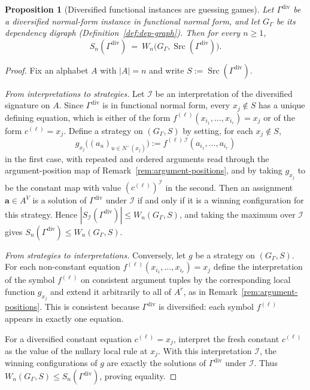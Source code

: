 \documentclass[11pt]{article}
\theoremstyle{plain}
\newtheorem{proposition}[theorem]{Proposition}
\theoremstyle{definition}
\theoremstyle{definition}
\theoremstyle{remark}
\newcommand{\A}{A}
\newcommand{\Sn}{S_n}
\newcommand{\abs}[1]{\left\lvert #1 \right\rvert}
\newcommand{\Src}{\operatorname{Src}}
\begin{document}
\begin{proposition}[Diversified functional instances are guessing games]
\label{prop:div-is-guessing}
Let $\Gamma^{\mathrm{div}}$ be a diversified normal-form instance in functional normal form, and let
$G_{\Gamma}$ be its dependency digraph (Definition~\ref{def:dep-graph}).
Then for every $n\ge 1$,
\[
  \Sn(\Gamma^{\mathrm{div}})\ =\ W_n\bigl(G_{\Gamma},\Src(\Gamma^{\mathrm{div}})\bigr).
\]
\end{proposition}

\begin{proof}
Fix an alphabet $\A$ with $|\A|=n$ and write $S:=\Src(\Gamma^{\mathrm{div}})$.

\smallskip
\noindent\emph{From interpretations to strategies.}
Let $\mathcal I$ be an interpretation of the diversified signature on $\A$.
Since $\Gamma^{\mathrm{div}}$ is in functional normal form, every $x_j\notin S$ has a unique defining equation,
which is either of the form
\(
  f^{(\ell)}(x_{i_1},\dots,x_{i_r})=x_j
\)
or of the form \(c^{(\ell)}=x_j\).
Define a strategy on $(G_{\Gamma},S)$ by setting, for each $x_j\notin S$,
\[
  g_{x_j}\bigl((a_u)_{u\in N^-(x_j)}\bigr)
  := f^{(\ell)\,\mathcal I}(a_{i_1},\dots,a_{i_r})
\]
in the first case, with repeated and ordered arguments read through the argument-position map of
Remark~\ref{rem:argument-positions}, and by taking $g_{x_j}$ to be the constant map with value
$(c^{(\ell)})^{\mathcal I}$ in the second.
Then an assignment $\mathbf a\in\A^V$ is a solution of $\Gamma^{\mathrm{div}}$ under $\mathcal I$ if and only if it
is a winning configuration for this strategy.
Hence
\(
  \abs{S_{\mathcal I}(\Gamma^{\mathrm{div}})}\le W_n(G_{\Gamma},S)
\),
and taking the maximum over $\mathcal I$ gives
\(
  \Sn(\Gamma^{\mathrm{div}})\le W_n(G_{\Gamma},S).
\)

\smallskip
\noindent\emph{From strategies to interpretations.}
Conversely, let $g$ be a strategy on $(G_{\Gamma},S)$.
For each non-constant equation
\(
  f^{(\ell)}(x_{i_1},\dots,x_{i_r})=x_j
\)
define the interpretation of the symbol $f^{(\ell)}$ on consistent argument tuples by the corresponding local
function $g_{x_j}$ and extend it arbitrarily to all of $\A^r$, as in
Remark~\ref{rem:argument-positions}.
This is consistent because $\Gamma^{\mathrm{div}}$ is diversified: each symbol $f^{(\ell)}$ appears in exactly one
equation.

For a diversified constant equation $c^{(\ell)}=x_j$, interpret the fresh constant $c^{(\ell)}$ as the value of
the nullary local rule at $x_j$.
With this interpretation $\mathcal I$, the winning configurations of $g$ are exactly the solutions of
$\Gamma^{\mathrm{div}}$ under $\mathcal I$.
Thus $W_n(G_{\Gamma},S)\le \Sn(\Gamma^{\mathrm{div}})$, proving equality.
\end{proof}
\end{document}
